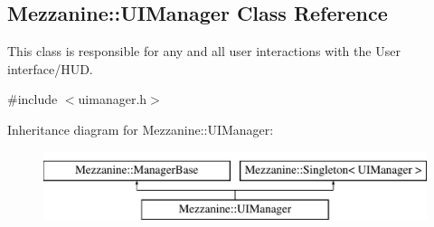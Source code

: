 \hypertarget{classMezzanine_1_1UIManager}{
\subsection{Mezzanine::UIManager Class Reference}
\label{classMezzanine_1_1UIManager}
}


This class is responsible for any and all user interactions with the User interface/HUD.  




{\ttfamily \#include $<$uimanager.h$>$}

Inheritance diagram for Mezzanine::UIManager:\begin{figure}[H]
\begin{center}
\leavevmode
\includegraphics[height=2.000000cm]{classMezzanine_1_1UIManager}
\end{center}
\end{figure}
